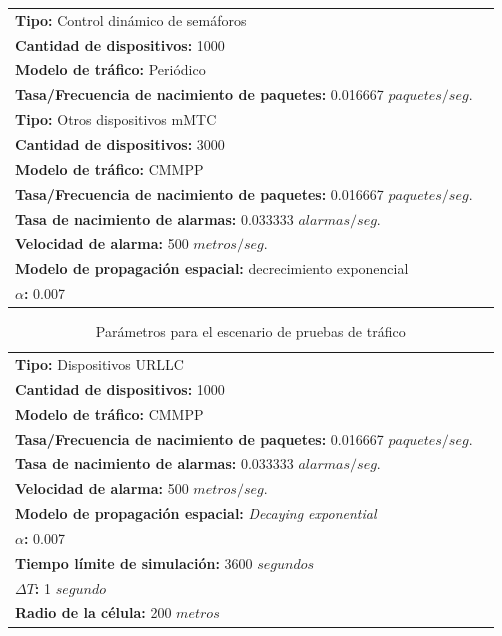 \begin{table}
\begin{tabular}{|m{16cm}|p{20cm}|}
        \textbf{Tipo:} Control dinámico de semáforos\\ \textbf{Cantidad de dispositivos:} 1000 \\ \textbf{Modelo de tráfico:} Periódico \\ \textbf{Tasa/Frecuencia de nacimiento de paquetes:} 0.016667  $paquetes/seg$. \\ \hline
        \textbf{Tipo:} Otros dispositivos mMTC\\ \textbf{Cantidad de dispositivos:} 3000 \\ \textbf{Modelo de tráfico:} CMMPP \\ \textbf{Tasa/Frecuencia de nacimiento de paquetes:} 0.016667  $paquetes/seg$. \\ \textbf{Tasa de nacimiento de alarmas:} 0.033333 $alarmas/seg$. \\ \textbf{Velocidad de alarma:} 500 $metros/seg$. \\ \textbf{Modelo de propagación espacial:} decrecimiento exponencial \\ \textbf{$\alpha$:} 0.007  \\ \hline
        
    \end{tabular}
\end{table}

\begin{table}
    \caption{Parámetros para el escenario de pruebas de tráfico}
    \label{tab:paramPruebaTrafico2}
    \centering
    \begin{tabular}{|m{16cm}|p{20cm}|} \\ 
        \textbf{Tipo:} Dispositivos URLLC \\ \textbf{Cantidad de dispositivos:} 1000 \\ \textbf{Modelo de tráfico:} CMMPP \\ \textbf{Tasa/Frecuencia de nacimiento de paquetes:} 0.016667  $paquetes/seg$. \\ \textbf{Tasa de nacimiento de alarmas:} 0.033333 $alarmas/seg$. \\ \textbf{Velocidad de alarma:} 500 $metros/seg$. \\ \textbf{Modelo de propagación espacial:} \textit{Decaying exponential} \\ \textbf{$\alpha$:} 0.007  \\ \hline
        \textbf{Tiempo límite de simulación:} 3600 $segundos$ \\ \textbf{$\Delta T$:} 1 $segundo$ \\ \textbf{Radio de la célula:} 200 $metros$ \\ \hline
    \end{tabular}
\end{table}

